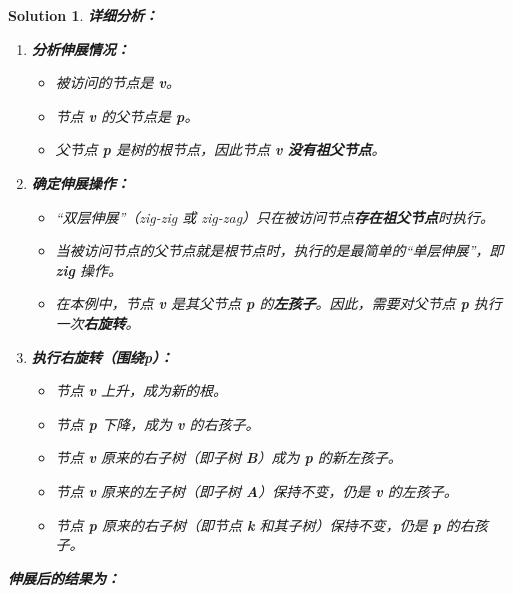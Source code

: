\documentclass[UTF8]{report}
\newtheorem{solution}{Solution}
\theoremstyle{MyLineTheoremStyle} %
\theoremstyle{MyBlockTheoremStyle} %
\theoremstyle{MySubsubsectionStyle} %
\begin{document}
\begin{solution}
\textbf{详细分析：}

\begin{enumerate}
    \item \textbf{分析伸展情况：}
    \begin{itemize}
        \item 被访问的节点是 \textbf{v}。
        \item 节点 \textbf{v} 的父节点是 \textbf{p}。
        \item 父节点 \textbf{p} 是树的根节点，因此节点 \textbf{v} \textbf{没有祖父节点}。
    \end{itemize}

    \item \textbf{确定伸展操作：}
    \begin{itemize}
        \item “双层伸展”（zig-zig 或 zig-zag）只在被访问节点\textbf{存在祖父节点}时执行。
        \item 当被访问节点的父节点就是根节点时，执行的是最简单的“单层伸展”，即 \textbf{zig} 操作。
        \item 在本例中，节点 \textbf{v} 是其父节点 \textbf{p} 的\textbf{左孩子}。因此，需要对父节点 \textbf{p} 执行一次\textbf{右旋转}。
    \end{itemize}

    \item \textbf{执行右旋转（围绕p）：}
    \begin{itemize}
        \item 节点 \textbf{v} 上升，成为新的根。
        \item 节点 \textbf{p} 下降，成为 \textbf{v} 的右孩子。
        \item 节点 \textbf{v} 原来的右子树（即子树 \textbf{B}）成为 \textbf{p} 的新左孩子。
        \item 节点 \textbf{v} 原来的左子树（即子树 \textbf{A}）保持不变，仍是 \textbf{v} 的左孩子。
        \item 节点 \textbf{p} 原来的右子树（即节点 \textbf{k} 和其子树）保持不变，仍是 \textbf{p} 的右孩子。
    \end{itemize}
\end{enumerate}

\textbf{伸展后的结果为：}
\begin{center}
\end{center}
\end{solution}
\end{document}
